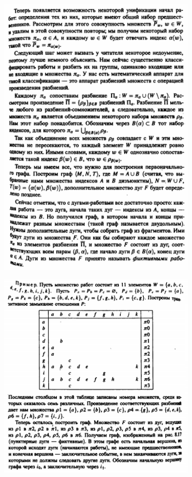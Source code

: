 \documentclass[discrete.tex]{subfiles}
\begin{document}
  \begin{figure}[H]
          \includegraphics[width=10cm]{pics/48_2}
          \centering
  \end{figure}

  \begin{figure}[H]
          \includegraphics[width=10cm]{pics/48_3}
          \centering
  \end{figure}
\end{document}
